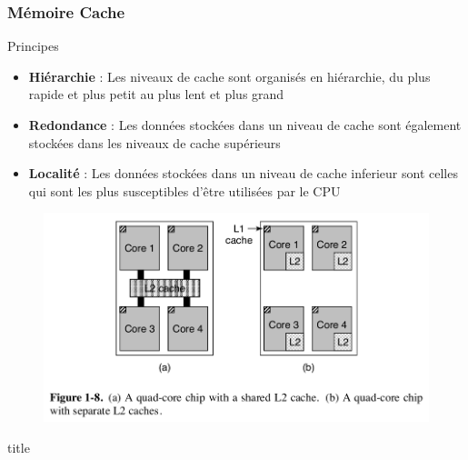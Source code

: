 \documentclass[8pt]{beamer}
\begin{document}
\begin{frame}
    \frametitle{Mémoire Cache}
    \begin{block}{Principes}
        \begin{itemize}
            \item \textbf{Hiérarchie} : Les niveaux de cache sont organisés en
                  hiérarchie, du plus rapide et plus petit au plus lent et plus
                  grand
            \item \textbf{Redondance} : Les données stockées dans un niveau de
                  cache
                  sont également stockées dans les niveaux de cache supérieurs
            \item \textbf{Localité} : Les données stockées dans un niveau de
                  cache
                  inferieur sont celles qui sont les plus susceptibles d'être
                  utilisées par le CPU
        \end{itemize}
    \end{block}
    \begin{figure}
        \centering
        \includegraphics[width=.6\textwidth]{figures/ProcCoresCache_T.png}
    \end{figure}

\end{frame}

\begin{frame}{title}
\end{frame}
\end{document}
